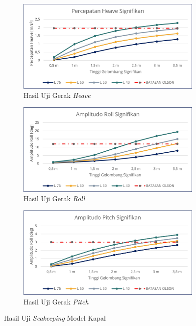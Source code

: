 \begin{figure}[!ht]
    \centering
    \begin{subfigure}{0.48\textwidth}
        \centering
        \includegraphics[width=\textwidth]{grafik/uji-heave-ori.jpg}
        \caption{Hasil Uji Gerak \emph{Heave}}
        \label{fig:uji-heave-ori}
    \end{subfigure}
    \hfill
    \begin{subfigure}{0.48\textwidth}
        \centering
        \includegraphics[width=\textwidth]{grafik/uji-roll-ori.jpg}
        \caption{Hasil Uji Gerak \emph{Roll}}
        \label{fig:uji-roll-ori}
    \end{subfigure}
    
    \vspace{1cm}  %
    
    \begin{subfigure}{0.48\textwidth}
        \centering
        \includegraphics[width=\textwidth]{grafik/uji-pitch-ori.jpg}
        \caption{Hasil Uji Gerak \emph{Pitch}}
        \label{fig:uji-pitch-ori}
    \end{subfigure}
    \caption{Hasil Uji \emph{Seakeeping} Model Kapal}
    \label{fig:uji-gerak-all}
\end{figure}
